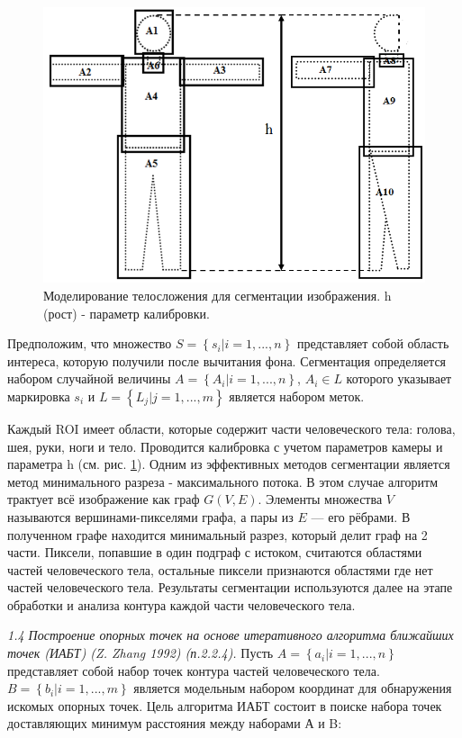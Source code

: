 \begin{figure}[ht!]
\centering
\includegraphics [width=0.45\linewidth] {images/h111.png}
\begin{center}
\caption{Моделирование телосложения для сегментации изображения. h (рост) - параметр калибровки.} \label{img1}
\end{center}
\end{figure}
Предположим, что множество $S=\left\{s_i|i=1, ..., n\right\}$ представляет собой область интереса, которую получили после вычитания фона.
Сегментация определяется набором случайной величины $A=\left\{A_i|i=1, ..., n\right\}$, $A_i\in L $ которого указывает маркировка $s_i$ и $L=\left\{L_j|j=1, ..., m\right\}$ является набором меток.

Каждый ROI имеет области, которые содержит части человеческого тела: голова, шея, руки, ноги и тело. Проводится калибровка с учетом параметров камеры и параметра h (см. рис. \ref{img1}). Одним из эффективных методов сегментации является метод минимального разреза - максимального потока. В этом случае алгоритм трактует всё изображение как граф $G\left(V, E\right)$. Элементы множества $V$ называются вершинами-пикселями графа, а пары из $E$ — его рёбрами. В полученном графе находится минимальный разрез, который делит граф на 2 части. Пиксели, попавшие в один подграф с истоком, считаются областями частей человеческого тела, остальные пиксели признаются областями где нет частей человеческого тела. Результаты сегментации используются далее на этапе обработки и анализа контура каждой части человеческого тела.

\textit{1.4 Построение опорных точек на основе итеративного алгоритма ближайших точек (ИАБТ) (Z. Zhang 1992) (п.2.2.4).} Пусть $A=\left\{a_i| i=1, ..., n\right\}$ представляет собой набор точек контура частей человеческого тела. $B=\left\{b_i| i=1, ..., m\right\}$ является модельным набором координат для обнаружения искомых опорных точек. Цель алгоритма ИАБТ состоит в поиске набора точек доставляющих минимум расстояния между наборами А и B:

